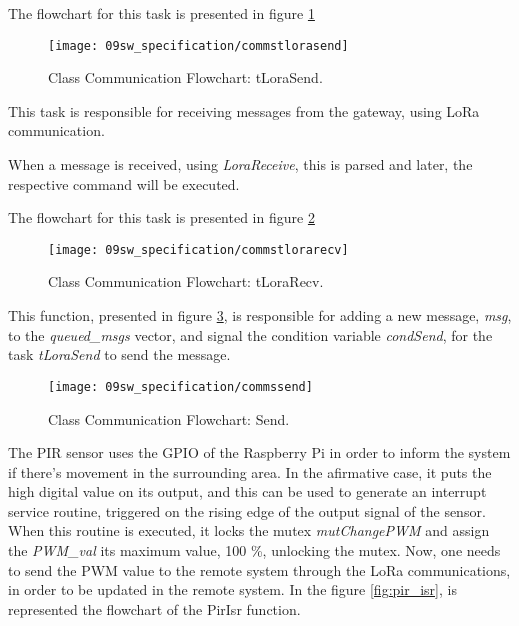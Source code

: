 The flowchart for this task is presented in figure \ref{fig:flow_tlorasend}

\begin{figure}[H]
	\centering		\texttt{[image: 09sw\_specification/commstlorasend]}
	\caption{Class Communication Flowchart: tLoraSend.}
	\label{fig:flow_tlorasend}
\end{figure}



This task is responsible for receiving messages from the gateway, using LoRa communication.

When a message is received, using \textit{LoraReceive}, this is parsed and later, the respective command will be executed.

The flowchart for this task is presented in figure \ref{fig:flow_tlorarecv}

\begin{figure}[H]
	\centering
	\texttt{[image: 09sw\_specification/commstlorarecv]}
	\caption{Class Communication Flowchart: tLoraRecv.}
	\label{fig:flow_tlorarecv}
\end{figure}


This function, presented in figure \ref{fig:flow_send}, is responsible for adding a new message, \textit{msg}, to the \textit{queued\_msgs} vector, and signal the condition variable \textit{condSend}, for the task \textit{tLoraSend} to send the message.

\begin{figure}[H]
	\centering	
	\texttt{[image: 09sw\_specification/commssend]}
	\caption{Class Communication Flowchart: Send.}
	\label{fig:flow_send}
\end{figure}



The PIR sensor uses the GPIO of the Raspberry Pi in order to inform the system if there's movement in the surrounding area. In the afirmative case, it puts the high digital value on its output, and this can be used to generate an interrupt service routine, triggered on the rising edge of the output signal of the sensor. When this routine is executed, it locks the mutex \textit{mutChangePWM} and assign the \textit{PWM\_val} its maximum value, 100 \%, unlocking the mutex. Now, one needs to send the PWM value to the remote system through the LoRa communications, in order to be updated in the remote system. In the figure \ref{fig:pir_isr}, is represented the flowchart of the PirIsr function.

